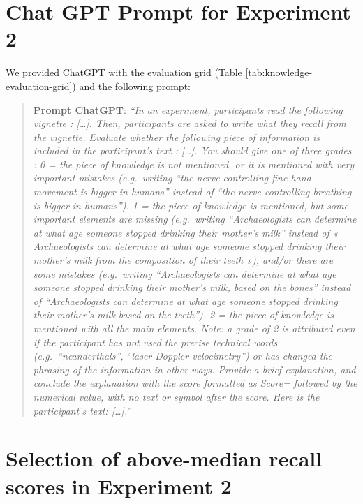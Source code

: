 \documentclass[
  english,
  doc,floatsintext]{apa6}
\begin{document}
\newpage

\appendix


\section{Chat GPT Prompt for Experiment 2}\label{gpt-prompt}

\FloatBarrier

We provided ChatGPT with the evaluation grid (Table \ref{tab:knowledge-evaluation-grid}) and the following prompt:

\begin{quote}
\textbf{Prompt ChatGPT}: \emph{``In an experiment, participants read the following vignette : {[}\ldots{]}. Then, participants are asked to write what they recall from the vignette. Evaluate whether the following piece of information is included in the participant's text : {[}\ldots{]}. You should give one of three grades : 0 = the piece of knowledge is not mentioned, or it is mentioned with very important mistakes (e.g.~writing ``the nerve controlling fine hand movement is bigger in humans'' instead of ``the nerve controlling breathing is bigger in humans''). 1 = the piece of knowledge is mentioned, but some important elements are missing (e.g.~writing ``Archaeologists can determine at what age someone stopped drinking their mother's milk'' instead of « Archaeologists can determine at what age someone stopped drinking their mother's milk from the composition of their teeth »), and/or there are some mistakes (e.g.~writing ``Archaeologists can determine at what age someone stopped drinking their mother's milk, based on the bones'' instead of ``Archaeologists can determine at what age someone stopped drinking their mother's milk based on the teeth''). 2 = the piece of knowledge is mentioned with all the main elements. Note: a grade of 2 is attributed even if the participant has not used the precise technical words (e.g.~``neanderthals'', ``laser-Doppler velocimetry'') or has changed the phrasing of the information in other ways. Provide a brief explanation, and conclude the explanation with the score formatted as Score= followed by the numerical value, with no text or symbol after the score. Here is the participant's text: {[}\ldots{]}.''}
\end{quote}

\clearpage

\section{Selection of above-median recall scores in Experiment 2}\label{above-median}
\end{document}
